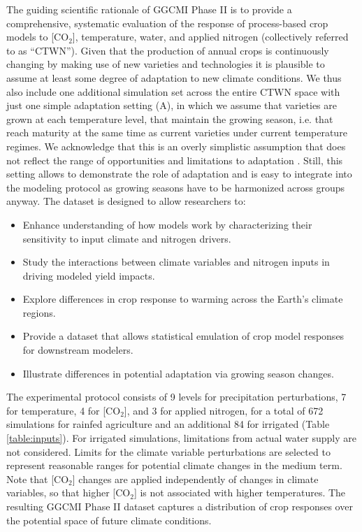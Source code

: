 \documentclass[gmd, manuscript]{copernicus} %
\begin{document}
The guiding scientific rationale of GGCMI Phase II is to provide a comprehensive, systematic evaluation of the response of process-based crop models to [CO$_2$], temperature, water, and applied nitrogen (collectively referred to as ``CTWN''). 
Given that the production of annual crops is continuously changing by making use of new varieties and technologies \citep{olesen2012changes} it is plausible to assume at least some degree of adaptation to new climate conditions. 
We thus also include one additional simulation set across the entire CTWN space with just one simple adaptation setting (A), in which we assume that varieties are grown at each temperature level, that maintain the growing season, i.e. that reach maturity at the same time as current varieties under current temperature regimes. 
We acknowledge that this is an overly simplistic assumption that does not reflect the range of opportunities and limitations to adaptation \citep{vadez2012adaptation,challinor2018improving}. 
Still, this setting allows to demonstrate the role of adaptation and is easy to integrate into the modeling protocol as growing seasons have to be harmonized across groups anyway.
The dataset is designed to allow researchers to:
\begin{itemize}
    \item Enhance understanding of how models work by characterizing their sensitivity to input climate and nitrogen drivers.
    \item Study the interactions between climate variables and nitrogen inputs in driving modeled yield impacts. 
    \item Explore differences in crop response to warming across the Earth's climate regions.
    \item Provide a dataset that allows statistical emulation of crop model responses for downstream modelers.
    \item Illustrate differences in potential adaptation via growing season changes. 
\end{itemize}
\vspace{-0.05in}

The experimental protocol consists of 9 levels for precipitation perturbations, 7 for temperature, 4 for [CO$_2$], and 3 for applied nitrogen, for a total of 672 simulations for rainfed agriculture and an additional 84 for irrigated (Table \ref{table:inputs}). 
For irrigated simulations, limitations from actual water supply are not considered. 
Limits for the climate variable perturbations are selected to represent reasonable ranges for potential climate changes in the medium term. 
Note that [CO$_2$] changes are applied independently of changes in climate variables, so that higher [CO$_2$] is not associated with higher temperatures. 
The resulting GGCMI Phase II dataset captures a distribution of crop responses over the potential space of future climate conditions.
\end{document}
